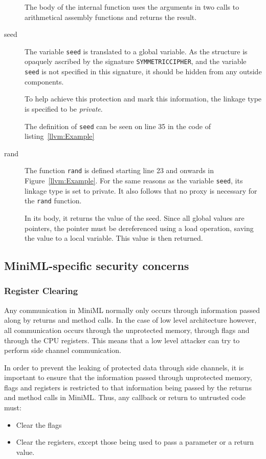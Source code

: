 \documentclass[10pt,a4paper]{report}
\begin{document}
\begin{description}
The body of the internal function uses the arguments in two calls to arithmetical assembly functions and returns the result.
\item[seed] The variable \texttt{seed} is translated to a global variable. As the structure is opaquely ascribed by the signature \texttt{SYMMETRICCIPHER}, and the variable \texttt{seed} is not specified in this signature, it should be hidden from any outside components.

To help achieve this protection and mark this information, the linkage type is specified to be \emph{private}.

The definition of \texttt{seed} can be seen on line 35 in the code of listing~\ref{llvm:Example}
\item[rand] The function \texttt{rand} is defined starting line 23 and onwards in Figure~\ref{llvm:Example}. For the same reasons as the variable \texttt{seed}, its linkage type is set to private. It also follows that no proxy is necessary for the \texttt{rand} function.

In its body, it returns the value of the seed. Since all global values are pointers, the pointer must be dereferenced using a load operation, saving the value to a local variable. This value is then returned.
\end{description}

\subsection{MiniML-specific security concerns}

\subsubsection{Register Clearing}
Any communication in \mbox{MiniML} normally only occurs through information passed along by returns and method calls.
In the case of low level architecture however, all communication occurs through the unprotected memory, through flags and through the CPU registers.  This means that a low level attacker can try to perform side channel communication.

In order to prevent the leaking of protected data through side channels, it is important to ensure that the information passed through unprotected memory, flags and registers is restricted to that information being passed by the returns and method calls in \mbox{MiniML}.
Thus, any callback or return to untrusted code must:
\begin{itemize}
\item Clear the flags
\item Clear the registers, except those being used to pass a parameter or a return value.
\end{itemize}
\end{document}
